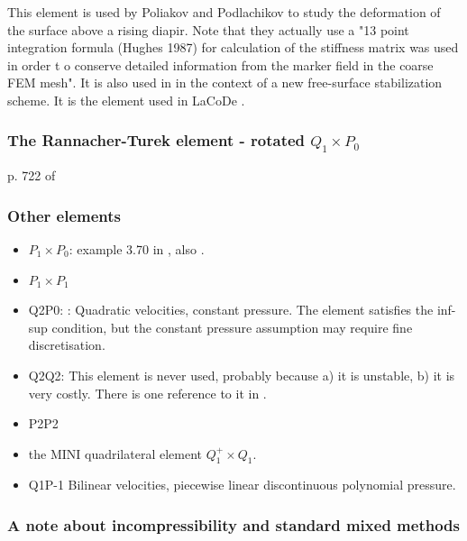 This element is used by Poliakov and Podlachikov \cite{popo92} to study the deformation of the surface above a rising diapir. Note that they actually use a "13 point integration formula (Hughes
1987) for calculation of the stiffness matrix was used in order
t o conserve detailed information from the marker field in
the coarse FEM mesh". 
It is also used in \cite{anmp15} in the context of a new free-surface stabilization scheme. 
It is the element used in LaCoDe \cite{demh19}.








\subsubsection{The Rannacher-Turek element - rotated $Q_1\times P_0$}

p. 722 of \cite{john16}

\cite{horg95,knob00,lisi12}


\subsubsection{Other elements}

\begin{itemize}
\item $P_1\times P_0$: example 3.70 in \cite{john16}, also \cite{john98}. 
\item $P_1\times P_1$
\item Q2P0: : 
Quadratic velocities, constant pressure. The element satisfies the inf-sup condition, but the constant pressure assumption may require fine discretisation.

\item Q2Q2: This element is never used, probably because a) it is unstable, b) it is very costly. 
There is one reference to it in \cite{hufb86}.
\item P2P2
\item the MINI quadrilateral element $Q_1^+\times Q_1$.  \cite{kwpa14}
\item Q1P-1 Bilinear velocities,  piecewise linear discontinuous polynomial pressure.
\end{itemize}

\subsubsection{A note about incompressibility and standard mixed methods}

